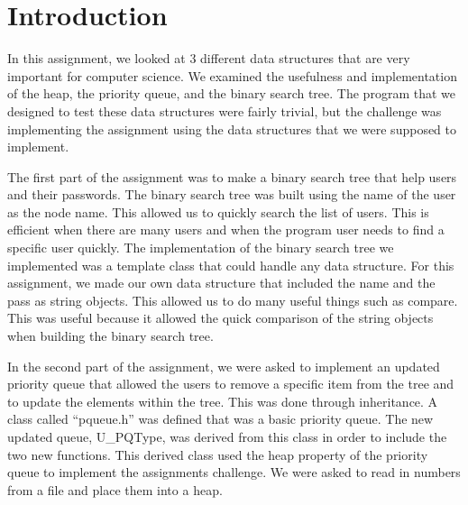 \documentclass[pdftex, 12pt]{article}
\begin{document}


\pagestyle{fancy}
\renewcommand{\sectionmark}[1]{\markright{\thesection}}
\lhead{}
\cfoot{}
\renewcommand{\footrulewidth}{0.4pt}

\tableofcontents

\newpage

\cfoot{}
\renewcommand{\footrulewidth}{0.4pt}

\section{Introduction}

In this assignment, we looked at 3 different data structures that are very important for computer science. We examined
the usefulness and implementation of the heap, the priority queue, and the binary search tree. The program that we
designed to test these data structures were fairly trivial, but the challenge was implementing the assignment using the
data structures that we were supposed to implement. 

The first part of the assignment was to make a binary search tree that help users and their passwords. The binary search
tree was built using the name of the user as the node name. This allowed us to quickly search the list of users. This is
efficient when there are many users and when the program user needs to find a specific user quickly. The implementation
of the binary search tree we implemented was a template class that could handle any data structure. For this assignment,
we made our own data structure that included the name and the pass as string objects. This allowed us to do many useful
things such as compare. This was useful because it allowed the quick comparison of the string objects when building the
binary search tree. 

In the second part of the assignment, we were asked to implement an updated priority queue that allowed the users to
remove a specific item from the tree and to update the elements within the tree. This was done through inheritance. A
class called ``pqueue.h'' was defined that was a basic priority queue. The new updated queue, U\_PQType, was derived
from this class in order to include the two new functions. This derived class used the heap property of the priority
queue to implement the assignments challenge. We were asked to read in numbers from a file and place them into a heap.
\end{document}
